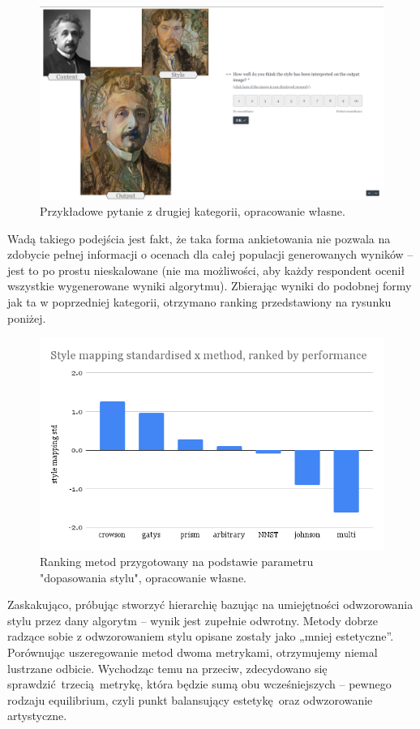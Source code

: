 \documentclass[12pt]{article}
\begin{document}
\begin{figure}[H]
    \centering
    \includegraphics[width=\textwidth]{p2}
    \caption{Przykładowe pytanie z drugiej kategorii, opracowanie własne.}
    \label{fig:21}
\end{figure}


Wadą takiego podejścia jest fakt, że taka forma ankietowania nie pozwala na zdobycie pełnej informacji o ocenach dla całej populacji generowanych wyników – jest to po prostu nieskalowane (nie ma możliwości, aby każdy respondent ocenił wszystkie wygenerowane wyniki algorytmu). Zbierając wyniki do podobnej formy jak ta w poprzedniej kategorii, otrzymano ranking przedstawiony na rysunku poniżej.

\begin{figure}[H]
    \centering
    \includegraphics[scale=0.55]{p5}
    \caption{Ranking metod przygotowany na podstawie parametru "dopasowania stylu", opracowanie własne.}
    \label{fig:22}
\end{figure}


Zaskakująco, próbując stworzyć hierarchię bazując na umiejętności odwzorowania stylu przez dany algorytm – wynik jest zupełnie odwrotny. Metody dobrze radzące sobie z odwzorowaniem stylu opisane zostały jako „mniej estetyczne”. Porównując uszeregowanie metod dwoma metrykami, otrzymujemy niemal lustrzane odbicie. Wychodząc temu na przeciw, zdecydowano się sprawdzić trzecią metrykę, która będzie sumą obu wcześniejszych – pewnego rodzaju equilibrium, czyli punkt balansujący estetykę oraz odwzorowanie artystyczne.
\end{document}
